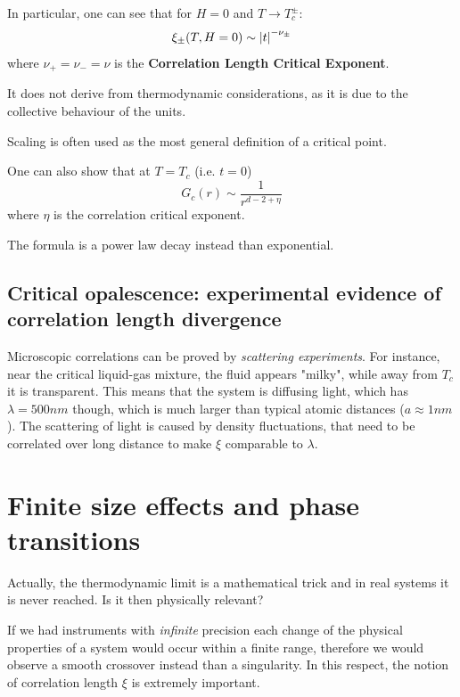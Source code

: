 \documentclass[../../Main/Main.tex]{subfiles}
\begin{document}
In particular, one can see that for \( H=0 \) and \( T \rightarrow T_c^\pm \):
\begin{equation}
  \xi _\pm (T,H=0) \sim \abs{t}^{- \nu _\pm}
  \label{eq:5_2}
\end{equation}
where \( \nu _+ = \nu _- = \nu  \) is the \textbf{Correlation Length Critical Exponent}.
\begin{remark}
It does not derive from thermodynamic considerations, as it is due to the collective behaviour of the units.
\end{remark}
\noindent Scaling is often used as the most general definition of a critical point. 

One can also show that at \( T=T_c \) (i.e. \( t=0 \))
\begin{equation}
  G_c (r) \sim \frac{1}{r^{d-2+\eta }}
\end{equation}
where \( \eta  \) is the correlation critical exponent.
\begin{remark}
The formula is a power law decay instead than exponential.
\end{remark}

\subsection{Critical opalescence: experimental evidence of correlation length divergence}
Microscopic correlations can be proved by \textit{scattering experiments}. For instance, near the critical liquid-gas mixture, the fluid appears "milky", while away from $T_c$ it is transparent. This means that the system is diffusing light, which has $\lambda=500nm$ though, which is much larger than typical atomic distances ($a \approx 1nm$). The scattering of light is caused by density fluctuations, that need to be correlated over long distance to make $\xi$ comparable to $\lambda$.

\section{Finite size effects and phase transitions}
Actually, the thermodynamic limit is a mathematical trick and in real systems it is never reached. Is it then physically relevant?

If we had instruments with \emph{infinite} precision each change of the physical properties of a system would occur within a finite range, therefore we would observe a smooth crossover instead than a singularity. In this respect, the notion of correlation length \( \xi  \) is extremely important.
\end{document}
